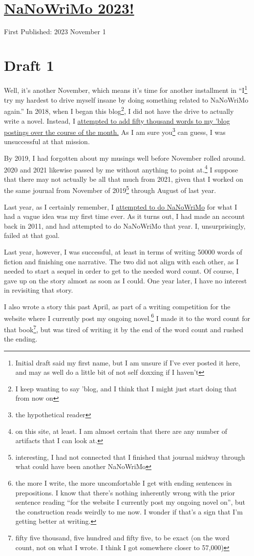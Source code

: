 \documentclass[12pt]{article}[titlepage]
\newcommand{\say}[1]{``#1''}
\newcommand{\1}{\={a}}
\newcommand{\2}{\={e}}
\newcommand{\3}{\={\i}}
\newcommand{\4}{\=o}
\newcommand{\5}{\=u}
\newcommand{\6}{\={A}}
\renewcommand{\,}{\textsuperscript{,}}
\begin{document}

\doublespacing
\section{\href{nanowrimo-5.html}{NaNoWriMo 2023!}}
First Published: 2023 November 1
\section{Draft 1}
Well, it's another November, which means it's time for another installment in \say{I\footnote{Initial draft said my first name, but I am unsure if I've ever posted it here, and may as well do a little bit of not self doxxing if I haven't} try my hardest to drive myself insane by doing something related to NaNoWriMo again.}
In 2018, when I began this blog\footnote{I keep wanting to say 'blog, and I think that I might just start doing that from now on}, I did not have the drive to actually write a novel.
Instead, I \href{nanowrimo.html}{attempted to add fifty thousand words to my 'blog postings over the course of the month.}
As I am sure you\footnote{the hypothetical reader} can guess, I was unsuccessful at that mission.

By 2019, I had forgotten about my musings well before November rolled around.
2020 and 2021 likewise passed by me without anything to point at.\footnote{on this site, at least. I am almost certain that there are any number of artifacts that I can look at.}
I suppose that there may not actually be all that much from 2021, given that I worked on the same journal from November of 2019\footnote{interesting, I had not connected that I finished that journal midway through what could have been another NaNoWriMo} through August of last year.

Last year, as I certainly remember, I \href{nanowrimo-2.html}{attempted to do NaNoWriMo} for what I had a vague idea was my first time ever.
As it turns out, I had made an account back in 2011, and had attempted to do NaNoWriMo that year.
I, unsurprisingly, failed at that goal.

Last year, however, I was successful, at least in terms of writing 50000 words of fiction and finishing one narrative.
The two did not align with each other, as I needed to start a sequel in order to get to the needed word count.
Of course, I gave up on the story almost as soon as I could.
One year later, I have no interest in revisiting that story.

I also wrote a story this past April, as part of a writing competition for the website where I currently post my ongoing novel.\footnote{the more I write, the more uncomfortable I get with ending sentences in prepositions.
I know that there's nothing inherently wrong with the prior sentence reading \say{for the website I currently post my ongoing novel on}, but the construction reads weirdly to me now.
I wonder if that's a sign that I'm getting better at writing.}
I made it to the word count for that book\footnote{fifty five thousand, five hundred and fifty five, to be exact (on the word count, not on what I wrote. I think I got somewhere closer to 57,000)}, but was tired of writing it by the end of the word count and rushed the ending.
\end{document}
